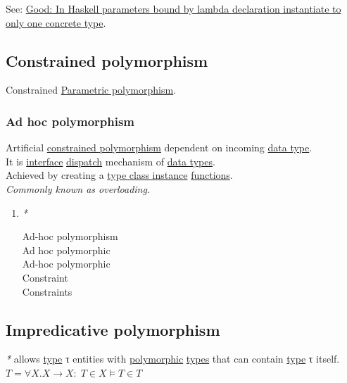 \documentclass[a4paper,14pt,oneside]{book}
\begin{document}
See: \hyperref[orgc363a82]{Good: In Haskell parameters bound by lambda declaration instantiate to only one concrete type}.\\

\subsection{\label{org708664e}Constrained polymorphism}
\label{sec:org5d4a27a}
Constrained \hyperref[orgc265751]{Parametric polymorphism}.\\

\subsubsection{\label{org495d40d}Ad hoc polymorphism}
\label{sec:orgf28c88f}
Artificial \hyperref[org708664e]{constrained polymorphism} dependent on incoming \hyperref[org2af9422]{data type}.\\
It is \hyperref[org762f438]{interface} \hyperref[orgbfde75b]{dispatch} mechanism of \hyperref[org58ab165]{data types}.\\
Achieved by creating a \hyperref[org1275cf1]{type class instance} \hyperref[org0bc2540]{functions}.\\

\emph{Commonly known as overloading.}\\

\begin{enumerate}
\item \emph{*}
\label{sec:org8508bac}

\label{org5d3a000}Ad-hoc polymorphism\\
\label{orgf0192ee}Ad hoc polymorphic\\
\label{org50e0efe}Ad-hoc polymorphic\\
\label{orgd898adc}Constraint\\
\label{orgca54c5f}Constraints\\
\end{enumerate}

\subsection{\label{org902d464}Impredicative polymorphism}
\label{sec:org55a7a9e}
\emph{*} allows \hyperref[org6ce6dd7]{type} τ entities with \hyperref[org115ca68]{polymorphic} \hyperref[orgc3d0384]{types} that can contain \hyperref[org6ce6dd7]{type} τ itself.\\
\(T = \forall X. X \to X : \; T \in X \vDash T \in T\)\\
\end{document}
